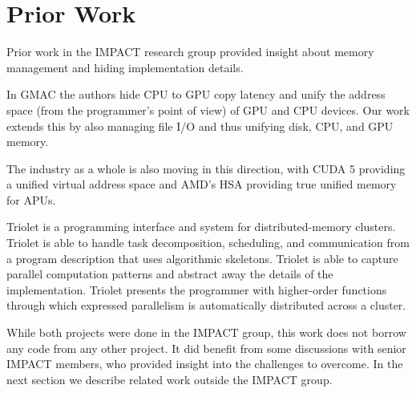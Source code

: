 \section{Prior Work}

Prior work in the IMPACT research group provided insight about memory
management and hiding implementation details.

In GMAC\cite{gmac} the authors hide CPU
	to GPU copy latency and unify the 
	address space (from the programmer's point of view)
	of GPU and CPU devices. 
Our work extends this by also managing file I/O and thus
	unifying disk, CPU, and GPU memory.

The industry as a whole is also moving in this direction, with CUDA 5 providing
a unified virtual address space and AMD's HSA providing true unified
memory for APUs.

Triolet\cite{rodrigues2014triolet} is a programming interface and system for
distributed-memory clusters. Triolet is able to handle
task decomposition, scheduling, and communication from a program description
that uses algorithmic skeletons. Triolet is able to capture parallel
computation patterns and abstract away the details of the implementation.
Triolet presents the programmer with higher-order functions through which
expressed parallelism is automatically distributed across a cluster.

While both projects were done in the IMPACT group, this work does
	not borrow any code from any other project. It did benefit from some
discussions with senior IMPACT members, who provided insight into the challenges to overcome.
In the next section we describe related work outside the IMPACT group.
